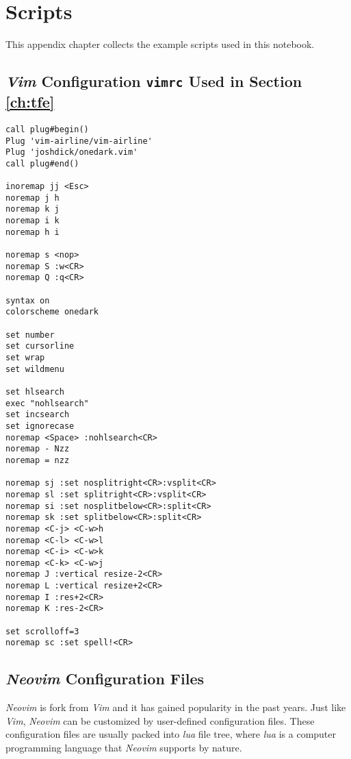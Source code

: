 \chapter{Scripts}

This appendix chapter collects the example scripts used in this notebook.

\section{\textit{Vim} Configuration \texttt{vimrc} Used in Section \ref{ch:tfe}}

\begin{lstlisting}
call plug#begin()
Plug 'vim-airline/vim-airline'
Plug 'joshdick/onedark.vim'
call plug#end()

inoremap jj <Esc>
noremap j h
noremap k j
noremap i k
noremap h i

noremap s <nop>
noremap S :w<CR>
noremap Q :q<CR>

syntax on
colorscheme onedark

set number
set cursorline
set wrap
set wildmenu

set hlsearch
exec "nohlsearch"
set incsearch
set ignorecase
noremap <Space> :nohlsearch<CR>
noremap - Nzz
noremap = nzz

noremap sj :set nosplitright<CR>:vsplit<CR>
noremap sl :set splitright<CR>:vsplit<CR>
noremap si :set nosplitbelow<CR>:split<CR>
noremap sk :set splitbelow<CR>:split<CR>
noremap <C-j> <C-w>h
noremap <C-l> <C-w>l
noremap <C-i> <C-w>k
noremap <C-k> <C-w>j
noremap J :vertical resize-2<CR>
noremap L :vertical resize+2<CR>
noremap I :res+2<CR>
noremap K :res-2<CR>

set scrolloff=3
noremap sc :set spell!<CR>
\end{lstlisting}

\section{\textit{Neovim} Configuration Files}

\textit{Neovim} is fork from \textit{Vim} and it has gained popularity in the past years. Just like \textit{Vim}, \textit{Neovim} can be customized by user-defined configuration files. These configuration files are usually packed into \textit{lua} file tree, where \textit{lua} is a computer programming language that \textit{Neovim} supports by nature.

